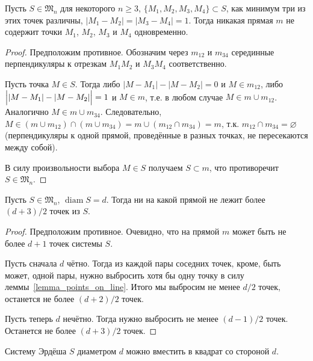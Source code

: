 \begin{lemma}
	\label{lemma_points_on_line}
	Пусть $S\in\mathfrak{M}_n$ для некоторого $n \geqslant 3$,
	$\{M_1, M_2, M_3, M_4\} \subset S$, как минимум три из этих точек различны,
	$|M_1 - M_2| = |M_3 - M_4| = 1$.
	Тогда никакая прямая $m$ не содержит точки $M_1$, $M_2$, $M_3$ и $M_4$ одновременно.
\end{lemma}

\begin{proof}
	Предположим противное.
	Обозначим через $m_{12}$ и $m_{34}$ серединные перпендикуляры к отрезкам $M_1 M_2$ и $M_3 M_4$ соответственно.

	Пусть точка $M\in S$.
	Тогда либо $|M - M_1| - |M - M_2| = 0$ и $M\in m_{12}$, либо $\Bigl||M - M_1| - |M - M_2|\Bigr| = 1$ и $M\in m$,
	т.е. в любом случае $M\in m \cup m_{12}$.
	Аналогично $M\in m \cup m_{34}$.
	Следовательно, $M\in (m \cup m_{12}) \cap (m \cup m_{34}) = m \cup (m_{12} \cap m_{34}) = m$,
	т.к. $m_{12} \cap m_{34} = \varnothing$ (перпендикуляры к одной прямой, проведённые в разных точках, не пересекаются между собой).

	В силу произвольности выбора $M \in S$ получаем $S \subset m$, что противоречит $S\in\mathfrak{M}_n$.
\end{proof}

\begin{corollary}
	\label{corollary:max_points_on_line}
	Пусть $S\in\mathfrak{M}_n$, $\operatorname{diam} S = d$.
	Тогда ни на какой прямой не лежит более $(d+3)/2$ точек из $S$.
\end{corollary}

\begin{proof}
	Предположим противное.
	Очевидно, что на прямой $m$ может быть не более $d+1$ точек системы $S$.

	Пусть сначала $d$ чётно.
	Тогда из каждой пары соседних точек, кроме, быть может, одной пары,
	нужно выбросить хотя бы одну точку в силу леммы~\ref{lemma_points_on_line}.
	Итого мы выбросим не менее $d/2$ точек,
	останется не более $(d+2)/2$ точек.

	Пусть теперь $d$ нечётно.
	Тогда нужно выбросить не менее $(d-1)/2$ точек.
	Останется не более $(d+3)/2$ точек.
\end{proof}

\begin{lemma}
	\label{lemma:square_container}
	Систему Эрдёша $S$ диаметром $d$ можно вместить в квадрат со стороной $d$.
\end{lemma}

